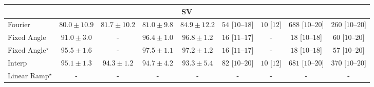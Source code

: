 \begin{tabular}{l|cccc|cccc|}
\cline{1-9}
\multicolumn{9}{c}{\rule{0pt}{8pt}SV} \\
\midrule
Fourier & {\cellcolor[HTML]{EDE8F3}} \color[HTML]{000000} $80.0\pm 10.9$ & {\cellcolor[HTML]{DAD9EA}} \color[HTML]{000000} $81.7\pm 10.2$ & {\cellcolor[HTML]{E2DFEE}} \color[HTML]{000000} $81.0\pm 9.8$ & {\cellcolor[HTML]{A9BFDC}} \color[HTML]{000000} $84.9\pm 12.2$ & {\cellcolor[HTML]{FEEBE8}} \color[HTML]{000000} $54$ [$10$--$18$] & {\cellcolor[HTML]{FFF7F3}} \color[HTML]{000000} $10$ [$12$] & {\cellcolor[HTML]{49006A}} \color[HTML]{F1F1F1} $688$ [$10$--$20$] & {\cellcolor[HTML]{FAA1B6}} \color[HTML]{000000} $260$ [$10$--$20$] \\
Fixed Angle & {\cellcolor[HTML]{2383BA}} \color[HTML]{F1F1F1} $91.0\pm 3.0$ & {\cellcolor[HTML]{000000}} \color[HTML]{F1F1F1} {\cellcolor{white}} \color{black} - & {\cellcolor[HTML]{03476F}} \color[HTML]{F1F1F1} $96.4\pm 1.0$ & {\cellcolor[HTML]{034267}} \color[HTML]{F1F1F1} $96.8\pm 1.2$ & {\cellcolor[HTML]{FFF6F2}} \color[HTML]{000000} $16$ [$11$--$17$] & {\cellcolor[HTML]{000000}} \color[HTML]{F1F1F1} {\cellcolor{white}} \color{black} - & {\cellcolor[HTML]{FFF5F1}} \color[HTML]{000000} $18$ [$10$--$18$] & {\cellcolor[HTML]{FEEAE7}} \color[HTML]{000000} $60$ [$10$--$20$] \\
Fixed Angle$^\star$ & {\cellcolor[HTML]{045382}} \color[HTML]{F1F1F1} $95.5\pm 1.6$ & {\cellcolor[HTML]{000000}} \color[HTML]{F1F1F1} {\cellcolor{white}} \color{black} - & {\cellcolor[HTML]{023858}} \color[HTML]{F1F1F1} $97.5\pm 1.1$ & {\cellcolor[HTML]{023B5D}} \color[HTML]{F1F1F1} $97.2\pm 1.2$ & {\cellcolor[HTML]{FFF6F2}} \color[HTML]{000000} $16$ [$11$--$17$] & {\cellcolor[HTML]{000000}} \color[HTML]{F1F1F1} {\cellcolor{white}} \color{black} - & {\cellcolor[HTML]{FFF5F1}} \color[HTML]{000000} $18$ [$10$--$18$] & {\cellcolor[HTML]{FEEBE7}} \color[HTML]{000000} $57$ [$10$--$20$] \\
Interp & {\cellcolor[HTML]{04588A}} \color[HTML]{F1F1F1} $95.1\pm 1.3$ & {\cellcolor[HTML]{046097}} \color[HTML]{F1F1F1} $94.3\pm 1.2$ & {\cellcolor[HTML]{045D92}} \color[HTML]{F1F1F1} $94.7\pm 4.2$ & {\cellcolor[HTML]{0569A5}} \color[HTML]{F1F1F1} $93.3\pm 5.4$ & {\cellcolor[HTML]{FDE4E0}} \color[HTML]{000000} $82$ [$10$--$20$] & {\cellcolor[HTML]{FFF7F3}} \color[HTML]{000000} $10$ [$12$] & {\cellcolor[HTML]{4C006B}} \color[HTML]{F1F1F1} $681$ [$10$--$20$] & {\cellcolor[HTML]{F15C9F}} \color[HTML]{F1F1F1} $370$ [$10$--$20$] \\
Linear Ramp$^\star$ & {\cellcolor[HTML]{000000}} \color[HTML]{F1F1F1} {\cellcolor{white}} \color{black} - & {\cellcolor[HTML]{000000}} \color[HTML]{F1F1F1} {\cellcolor{white}} \color{black} - & {\cellcolor[HTML]{000000}} \color[HTML]{F1F1F1} {\cellcolor{white}} \color{black} - & {\cellcolor[HTML]{000000}} \color[HTML]{F1F1F1} {\cellcolor{white}} \color{black} - & {\cellcolor[HTML]{000000}} \color[HTML]{F1F1F1} {\cellcolor{white}} \color{black} - & {\cellcolor[HTML]{000000}} \color[HTML]{F1F1F1} {\cellcolor{white}} \color{black} - & {\cellcolor[HTML]{000000}} \color[HTML]{F1F1F1} {\cellcolor{white}} \color{black} - & {\cellcolor[HTML]{000000}} \color[HTML]{F1F1F1} {\cellcolor{white}} \color{black} - \\

\end{tabular}
